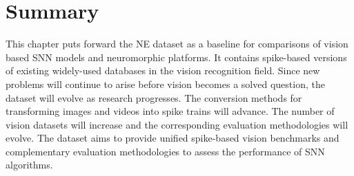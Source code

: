 %
%

\section{Summary}
\label{sec:summ}
This chapter puts forward the NE dataset as a baseline for comparisons of vision based SNN models and neuromorphic platforms.
It contains spike-based versions of existing widely-used databases in the vision recognition field.
Since new problems will continue to arise before vision becomes a solved question, the dataset will evolve as research progresses. 
The conversion methods for transforming images and videos into spike trains will advance. The number of vision datasets will increase and the corresponding evaluation methodologies will evolve.
The dataset aims to provide unified spike-based vision benchmarks and complementary evaluation methodologies to assess the performance of SNN algorithms.

